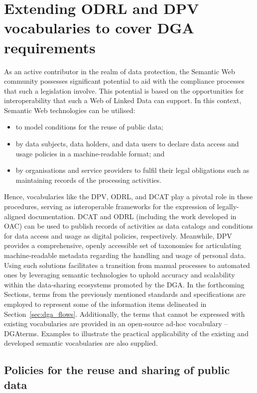 \section{Extending ODRL and DPV vocabularies to cover DGA requirements}
\label{sec:extending_dga}

As an active contributor in the realm of data protection, the Semantic Web community possesses significant potential to aid with the compliance processes that such a legislation involve.
This potential is based on the opportunities for interoperability that such a Web of Linked Data can support.
In this context, Semantic Web technologies can be utilised:

\begin{itemize}
    \item to model conditions for the reuse of public data;
    \item by data subjects, data holders, and data users to declare data access and usage policies in a machine-readable format; and
    \item by organisations and service providers to fulfil their legal obligations such as maintaining records of the processing activities.
\end{itemize}

Hence, vocabularies like the DPV, ODRL, and DCAT play a pivotal role in these procedures, serving as interoperable frameworks for the expression of legally-aligned documentation.
DCAT and ODRL (including the work developed in OAC) can be used to publish records of activities as data catalogs and conditions for data access and usage as digital policies, respectively.
Meanwhile, DPV provides a comprehensive, openly accessible set of taxonomies for articulating machine-readable metadata regarding the handling and usage of personal data.
Using such solutions facilitates a transition from manual processes to automated ones by leveraging semantic technologies to uphold accuracy and scalability within the data-sharing ecosystems promoted by the DGA.
In the forthcoming Sections, terms from the previously mentioned standards and specifications are employed to represent some of the information items delineated in Section~\ref{sec:dga_flows}.
Additionally, the terms that cannot be expressed with existing vocabularies are provided in an open-source ad-hoc vocabulary -- DGAterms.
Examples to illustrate the practical applicability of the existing and developed semantic vocabularies are also supplied.

\subsection{Policies for the reuse and sharing of public data}
\label{sec:dga_policies}

